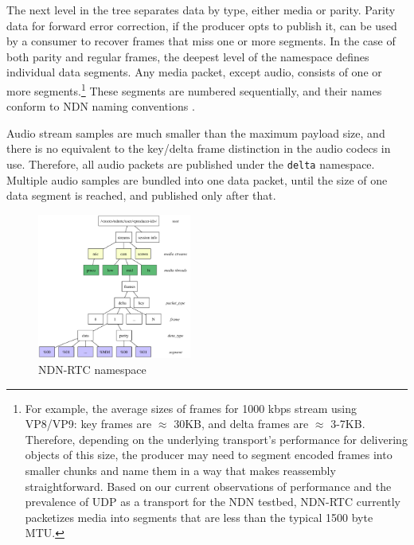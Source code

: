 \documentclass{icn/sig-alternate-2013} %
\newcommand{\ndnrtcName}{NDN-RTC} %
\begin{document}
The next level in the tree separates data by type, either media or parity. Parity data for forward error correction, if the producer opts to publish it, can be used by a consumer to recover frames that miss one or more segments. 
In the case of both parity and regular frames, the deepest level of the namespace defines individual data segments. Any media packet, except audio, consists of one or more segments.\footnote{For example, the average sizes of frames for 1000 kbps stream using VP8/VP9: key frames are $\approx$ 30KB, and delta frames are $\approx$ 3-7KB. Therefore, depending on the underlying transport's performance for delivering objects of this size, the producer may need to segment encoded frames into smaller chunks and name them in a way that makes reassembly straightforward. Based on our current observations of performance and the prevalence of UDP as a transport for the NDN testbed, \ndnrtcName{} currently packetizes media into segments that are less than the typical 1500 byte MTU.} These segments are numbered sequentially, and their names conform to NDN naming conventions \cite{ndnnaming}.

Audio stream samples are much smaller than the maximum payload size, and there is no equivalent to the key/delta frame distinction in the audio codecs in use. Therefore, all audio packets are published under the \texttt{delta} namespace. Multiple audio samples are bundled into one data packet, until the size of one data segment is reached, and published only after that.

\begin{figure}[t!]
\centering
\includegraphics[width=0.45\textwidth]{namespace}
\caption{\ndnrtcName{} namespace}
\label{fig:namespace}
\end{figure}
\end{document}
